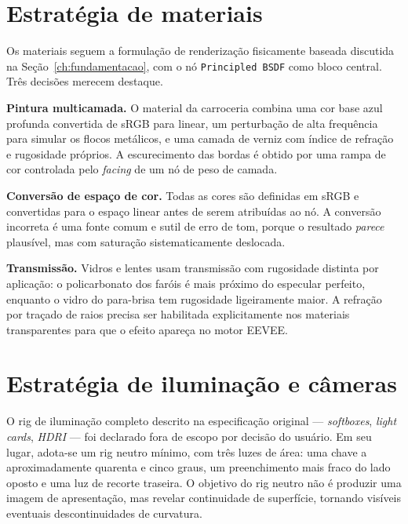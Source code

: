 \section{Estrat\'egia de materiais}

Os materiais seguem a formula{\c{c}}\~ao de renderiza{\c{c}}\~ao fisicamente baseada discutida na
Se{\c{c}}\~ao~\ref{ch:fundamentacao}, com o n\'o \texttt{Principled BSDF} como bloco central.
Tr\^es decis\~oes merecem destaque.

\textbf{Pintura multicamada.} O material da carroceria combina uma cor base azul profunda
convertida de sRGB para linear, um perturba{\c{c}}\~ao de alta frequ\^encia para simular os
flocos met\'alicos, e uma camada de verniz com \'indice de refra{\c{c}}\~ao e rugosidade
pr\'oprios. A escurecimento das bordas \'e obtido por uma rampa de cor controlada pelo
\emph{facing} de um n\'o de peso de camada.

\textbf{Convers\~ao de espa{\c{c}}o de cor.} Todas as cores s\~ao definidas em sRGB e
convertidas para o espa{\c{c}}o linear antes de serem atribu\'idas ao n\'o. A
convers\~ao incorreta \'e uma fonte comum e sutil de erro de tom, porque o resultado
\emph{parece} plaus\'ivel, mas com satura{\c{c}}\~ao sistematicamente deslocada.

\textbf{Transmiss\~ao.} Vidros e lentes usam transmiss\~ao com rugosidade distinta por
aplica{\c{c}}\~ao: o policarbonato dos far\'ois \'e mais pr\'oximo do especular perfeito,
enquanto o vidro do para-brisa tem rugosidade ligeiramente maior. A refra{\c{c}}\~ao por
tra{\c{c}}ado de raios precisa ser habilitada explicitamente nos materiais
transparentes para que o efeito apare{\c{c}}a no motor EEVEE.

\section{Estrat\'egia de ilumina{\c{c}}\~ao e c\^ameras}

O rig de ilumina{\c{c}}\~ao completo descrito na especifica{\c{c}}\~ao original ---
\emph{softboxes}, \emph{light cards}, \emph{HDRI} --- foi declarado fora de escopo por
decis\~ao do usu\'ario. Em seu lugar, adota-se um rig neutro m\'inimo, com tr\^es luzes de
\'area: uma chave a aproximadamente quarenta e cinco graus, um preenchimento
mais fraco do lado oposto e uma luz de recorte traseira. O objetivo do rig neutro
n\~ao \'e produzir uma imagem de apresenta{\c{c}}\~ao, mas revelar continuidade de superf\'icie,
tornando vis\'iveis eventuais descontinuidades de curvatura.

